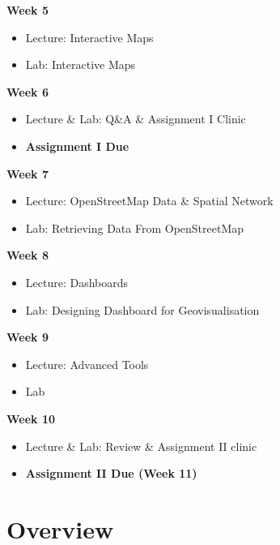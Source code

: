 \documentclass[
  letterpaper,
  DIV=11,
  numbers=noendperiod]{scrreprt}
\providecommand{\tightlist}{%
  \setlength{\itemsep}{0pt}\setlength{\parskip}{0pt}}\usepackage{longtable,booktabs,array}
\begin{document}
\textbf{Week 5}

\begin{itemize}
\item
  Lecture: Interactive Maps
\item
  Lab: Interactive Maps
\end{itemize}

\textbf{Week 6}

\begin{itemize}
\item
  Lecture \& Lab: Q\&A \& Assignment I Clinic
\item
  \textbf{Assignment I Due}
\end{itemize}

\textbf{Week 7}

\begin{itemize}
\item
  Lecture: OpenStreetMap Data \& Spatial Network
\item
  Lab: Retrieving Data From OpenStreetMap
\end{itemize}

\textbf{Week 8}

\begin{itemize}
\item
  Lecture: Dashboards
\item
  Lab: Designing Dashboard for Geovisualisation
\end{itemize}

\textbf{Week 9}

\begin{itemize}
\item
  Lecture: Advanced Tools
\item
  Lab
\end{itemize}

\textbf{Week 10}

\begin{itemize}
\tightlist
\item
  Lecture \& Lab: Review \& Assignment II clinic
\item
  \textbf{Assignment II Due (Week 11)}
\end{itemize}


\hypertarget{overview}{%
\chapter*{Overview}\label{overview}}

\end{document}
